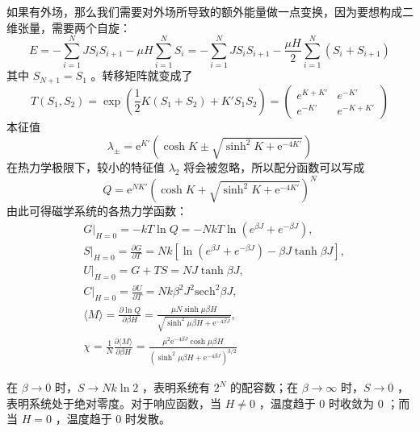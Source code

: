如果有外场，那么我们需要对外场所导致的额外能量做一点变换，因为要想构成二维张量，需要两个自旋：
\[
    E = -\sum_{i=1}^N JS_i S_{i+1} - \mu H\sum_{i=1}^N S_i = -\sum_{i=1}^N JS_i S_{i+1} - \frac{\mu H}{2} \sum_{i=1}^N (S_i + S_{i+1})
\]
其中 $S_{N+1} = S_1$ 。转移矩阵就变成了
\begin{equation}
    T(S_1,S_2) = \exp(\frac{1}{2}K (S_1+S_2) + K' S_1 S_{2}) = \begin{pmatrix}
        e^{K+K'} & e^{-K'} \\
        e^{-K'} & e^{-K+K'}
    \end{pmatrix} 
\end{equation}
本征值
\begin{equation}
    \lambda_\pm = \mathrm{e}^{ K'}\left(\cosh K \pm \sqrt{\sinh ^2 K + \mathrm{e}^{-4 K'}}\right)
\end{equation}
在热力学极限下，较小的特征值 $\lambda_2$ 将会被忽略，所以配分函数可以写成
\begin{equation}
    Q=\mathrm{e}^{N K'}\left(\cosh K+\sqrt{\sinh ^2 K+\mathrm{e}^{-4 K'}}\right)^N
\end{equation}
由此可得磁学系统的各热力学函数：
\begin{align*}
    &G\bigg|_{H=0} = -kT\ln Q = -NkT \ln (e^{\beta J} + e^{-\beta J}), \\
    &S\bigg|_{H=0} = \frac{\partial G}{\partial T} = Nk\left[\ln (e^{\beta J} + e^{-\beta J}) - \beta J \tanh\beta J\right],\\
    &U\bigg|_{H=0} = G + TS =  NJ \tanh\beta J,\\
    &C\bigg|_{H=0} = \frac{\partial U}{\partial T} = Nk\beta^2 J^2 \mathrm{sech}^2 \beta J,\\
    &\langle M \rangle = \frac{\partial \ln Q}{\partial \beta H} = \frac{\mu N\sinh \mu \beta H}{\sqrt{\sinh ^2 \mu \beta H+\mathrm{e}^{-4 \beta J}}},\\
    &\chi = \frac{1}{N} \frac{\partial \langle M \rangle}{\partial \beta H} = \frac{\mu^2 \mathrm{e}^{-4 \beta J}\cosh \mu\beta H}{\left(\sinh ^2 \mu \beta H+\mathrm{e}^{-4 \beta J}\right)^{3/2}}
\end{align*}

在 $\beta \rightarrow 0$ 时，$S \rightarrow Nk\ln 2$ ，表明系统有 $2^N$ 的配容数；在 $\beta \rightarrow \infty$ 时，$S \rightarrow 0$ ，表明系统处于绝对零度。对于响应函数，当 $H \neq 0$ ，温度趋于 $0$ 时收敛为 $0$ ；而当 $H = 0$ ，温度趋于 $0$ 时发散。

